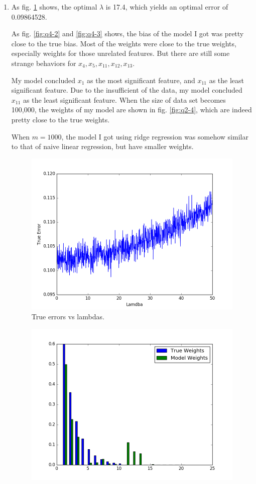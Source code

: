 \documentclass[letter, 12pt]{article}
\begin{document}
\begin{enumerate}
    	\item {}
    	\par{As fig. \ref{fig:q4-1} shows, the optimal $ \lambda $ is 17.4, which yields an optimal error of 0.09864528.}
    	\par{As fig. \ref{fig:q4-2} and \ref{fig:q4-3} shows, the bias of the model I got was pretty close to the true bias. Most of the weights were close to the true weights, especially weights for those unrelated features. But there are still some strange behaviors for $ x_4, x_5, x_{11}, x_{12}, x_{13} $.}
    	\par{My model concluded $ x_1 $ as the most significant feature, and $ x_{11} $ as the least significant feature. Due to the insufficient of the data, my model concluded $ x_{11} $ as the least significant feature. When the size of data set becomes 100,000, the weights of my model are shown in fig. \ref{fig:q2-4}, which are indeed pretty close to the true weights.}
    	\par{When $ m = 1000 $, the model I got using ridge regression was somehow similar to that of naive linear regression, but have smaller weights.}
    	\begin{figure}[H]
    		\centering
    		\centering
    		\includegraphics[width=0.7\linewidth]{q4-1.png}
    		\caption{True errors vs lambdas.}
    		\label{fig:q4-1}
    	\end{figure}
    	\begin{figure}[H]
    		\centering
    		\begin{minipage}{.48\textwidth}
    			\centering
    			\includegraphics[width=\linewidth]{q4-2.png}

\end{minipage}
\end{figure}
\end{enumerate}
\end{document}
